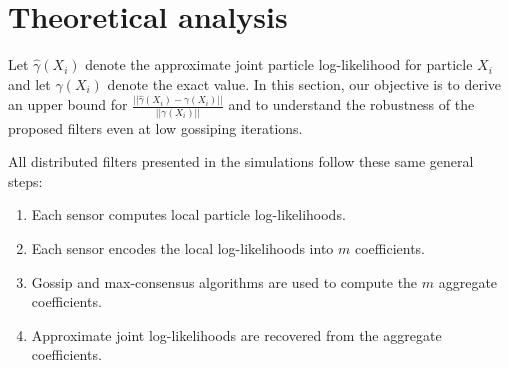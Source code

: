 \documentclass[10pt,letterpaper,final]{article}
\begin{document}


\section{Theoretical analysis}
Let $\hat{\gamma}(X_i)$ denote the approximate joint particle log-likelihood for particle $X_i$ and let $\gamma(X_i)$ denote the exact value. In this section, our objective is to derive an upper bound for $\frac{||\hat{\gamma}(X_i)-\gamma(X_i)||}{||\gamma(X_i)||}$ and to understand the robustness of the proposed filters even at low gossiping iterations.

All distributed filters presented in the simulations follow these same general steps:
\begin{enumerate}
\item Each sensor computes local particle log-likelihoods.
\item Each sensor encodes the local log-likelihoods into $m$ coefficients.
\item Gossip and max-consensus algorithms are used to compute the $m$ aggregate coefficients. 
\item Approximate joint log-likelihoods are recovered from the aggregate coefficients. 
\end{enumerate}
\end{document}
